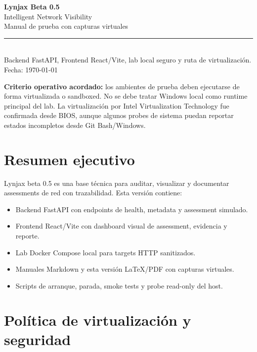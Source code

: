 \documentclass[11pt,letterpaper]{article}
\begin{document}
\begin{titlepage}
  \centering
  \vspace*{1.0cm}
  {\Huge\bfseries\color{LynjaxNavy} Lynjax Beta 0.5\\[0.25cm]}
  {\Large Intelligent Network Visibility\\[0.5cm]}
  {\Large Manual de prueba con capturas virtuales\\[1.0cm]}
  \rule{0.82\textwidth}{1pt}\\[0.5cm]
  {\large Backend FastAPI, Frontend React/Vite, lab local seguro y ruta de virtualización.\\[0.75cm]}
  {\large Fecha: \today\\}
  \vfill
  \begin{minipage}{0.82\textwidth}
  \textbf{Criterio operativo acordado:} los ambientes de prueba deben ejecutarse de forma virtualizada o sandboxed. No se debe tratar Windows local como runtime principal del lab. La virtualización por Intel Virtualization Technology fue confirmada desde BIOS, aunque algunos probes de sistema puedan reportar estados incompletos desde Git Bash/Windows.
  \end{minipage}
\end{titlepage}

\tableofcontents
\newpage

\section{Resumen ejecutivo}

Lynjax beta 0.5 es una base técnica para auditar, visualizar y documentar assessments de red con trazabilidad. Esta versión contiene:

\begin{itemize}
  \item Backend FastAPI con endpoints de health, metadata y assessment simulado.
  \item Frontend React/Vite con dashboard visual de assessment, evidencia y reporte.
  \item Lab Docker Compose local para targets HTTP sanitizados.
  \item Manuales Markdown y esta versión LaTeX/PDF con capturas virtuales.
  \item Scripts de arranque, parada, smoke tests y probe read-only del host.
\end{itemize}

\section{Política de virtualización y seguridad}
\end{document}
